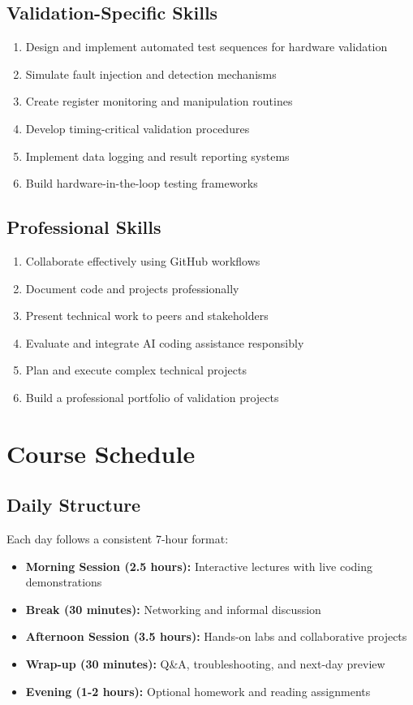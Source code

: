 \documentclass[11pt,a4paper]{article}
\begin{document}
\subsection{Validation-Specific Skills}
\begin{enumerate}
    \item Design and implement automated test sequences for hardware validation
    \item Simulate fault injection and detection mechanisms
    \item Create register monitoring and manipulation routines
    \item Develop timing-critical validation procedures
    \item Implement data logging and result reporting systems
    \item Build hardware-in-the-loop testing frameworks
\end{enumerate}

\subsection{Professional Skills}
\begin{enumerate}
    \item Collaborate effectively using GitHub workflows
    \item Document code and projects professionally
    \item Present technical work to peers and stakeholders
    \item Evaluate and integrate AI coding assistance responsibly
    \item Plan and execute complex technical projects
    \item Build a professional portfolio of validation projects
\end{enumerate}

\section{Course Schedule}

\subsection{Daily Structure}
Each day follows a consistent 7-hour format:
\begin{itemize}
    \item \textbf{Morning Session (2.5 hours):} Interactive lectures with live coding demonstrations
    \item \textbf{Break (30 minutes):} Networking and informal discussion
    \item \textbf{Afternoon Session (3.5 hours):} Hands-on labs and collaborative projects
    \item \textbf{Wrap-up (30 minutes):} Q\&A, troubleshooting, and next-day preview
    \item \textbf{Evening (1-2 hours):} Optional homework and reading assignments
\end{itemize}
\end{document}
